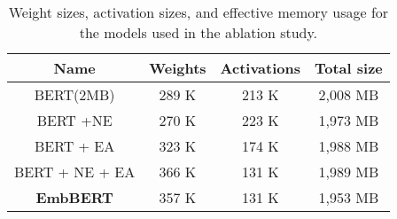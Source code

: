 \begin{table}[htbp]
    \caption{Weight sizes, activation sizes, and effective memory usage for the models used in the ablation study.}
    \begin{center}
    
        \begin{tabular}{|c | c c c |}
        \hline

        \textbf{Name} & \textbf{Weights} & \textbf{Activations} & \textbf{Total size} \\
        \hline \hline
        BERT(2MB)        & 289 K     & 213 K     & 2,008 MB \\
        BERT +NE \cite{NanoBERT}  & 270 K     & 223 K     & 1,973 MB \\
        BERT + EA \cite{efficient_attention}  & 323 K     & 174 K     & 1,988 MB \\
        BERT + NE + EA   & 366 K     & 131 K     & 1,989 MB \\
        \hline
        \textbf{EmbBERT}        & 357 K     & 131 K     & 1,953 MB \\
        \hline
        \end{tabular}
    
    \end{center}
    \label{table:memory_ablation}
\end{table}